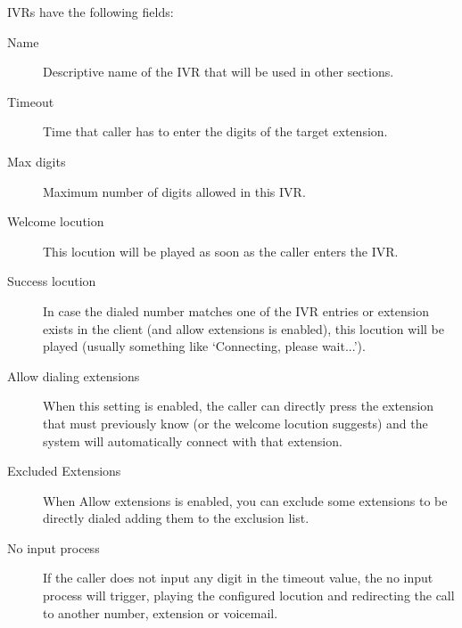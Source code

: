 \documentclass[letterpaper,10pt,spanish]{sphinxmanual}
\begin{document}
IVRs have the following fields:
\begin{description}
\item[{Name}] \leavevmode{}\label{administration_portal/client/vpbx/routing_endpoints/ivrs:term-name}
Descriptive name of the IVR that will be used in other sections.

\item[{Timeout}] \leavevmode{}\label{administration_portal/client/vpbx/routing_endpoints/ivrs:term-timeout}
Time that caller has to enter the digits of the target extension.

\item[{Max digits}] \leavevmode{}\label{administration_portal/client/vpbx/routing_endpoints/ivrs:term-max-digits}
Maximum number of digits allowed in this IVR.

\item[{Welcome locution}] \leavevmode{}\label{administration_portal/client/vpbx/routing_endpoints/ivrs:term-welcome-locution}
This locution will be played as soon as the caller enters the IVR.

\item[{Success locution}] \leavevmode{}\label{administration_portal/client/vpbx/routing_endpoints/ivrs:term-success-locution}
In case the dialed number matches one of the IVR entries or extension
exists in the client (and allow extensions is enabled), this locution
will be played (usually something like `Connecting, please wait...').

\item[{Allow dialing extensions}] \leavevmode{}\label{administration_portal/client/vpbx/routing_endpoints/ivrs:term-allow-dialing-extensions}
When this setting is enabled, the caller can directly press the extension
that must previously know (or the welcome locution suggests) and the system
will automatically connect with that extension.

\item[{Excluded Extensions}] \leavevmode{}\label{administration_portal/client/vpbx/routing_endpoints/ivrs:term-excluded-extensions}
When Allow extensions is enabled, you can exclude some extensions to be
directly dialed adding them to the exclusion list.

\item[{No input process}] \leavevmode{}\label{administration_portal/client/vpbx/routing_endpoints/ivrs:term-no-input-process}
If the caller does not input any digit in the timeout value, the
no input process will trigger, playing the configured locution and
redirecting the call to another number, extension or voicemail.


\end{description}
\end{document}
